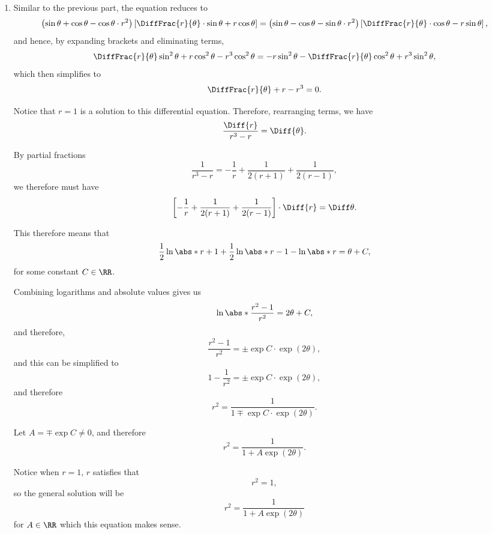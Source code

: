 \begin{enumerate}
    \item Similar to the previous part, the equation reduces to
          \[
              \left(\sin \theta + \cos \theta - \cos \theta \cdot r^2\right) \left[\DiffFrac{r}{\theta} \cdot \sin \theta + r \cos \theta\right] = \left(\sin \theta - \cos \theta - \sin \theta \cdot r^2\right) \left[\DiffFrac{r}{\theta} \cdot \cos \theta - r \sin \theta\right],
          \]
          and hence, by expanding brackets and eliminating terms,
          \[
              \DiffFrac{r}{\theta} \sin^2 \theta + r \cos^2 \theta - r^3 \cos^2 \theta = -r \sin^2 \theta - \DiffFrac{r}{\theta} \cos^2\theta + r^3 \sin^2 \theta,
          \]
          which then simplifies to
          \[
              \DiffFrac{r}{\theta} + r - r^3 = 0.
          \]

          Notice that \(r = 1\) is a solution to this differential equation. Therefore, rearranging terms, we have
          \[
              \frac{\Diff{r}}{r^3 - r} = \Diff{\theta}.
          \]

          By partial fractions
          \[
              \frac{1}{r^3 - r} = -\frac{1}{r} + \frac{1}{2(r + 1)} + \frac{1}{2(r - 1)},
          \]
          we therefore must have
          \[
              \left[-\frac{1}{r} + \frac{1}{2(r + 1)} + \frac{1}{2(r - 1)}\right] \cdot \Diff{r} = \Diff \theta.
          \]

          This therefore means that
          \[
              \frac{1}{2} \ln \abs*{r + 1} + \frac{1}{2} \ln \abs*{r - 1} - \ln \abs*{r} = \theta + C,
          \]
          for some constant \(C \in \RR\).

          Combining logarithms and absolute values gives us
          \[
              \ln \abs*{\frac{r^2 - 1}{r^2}} = 2\theta + C,
          \]
          and therefore,
          \[
              \frac{r^2 - 1}{r^2} = \pm \exp C \cdot \exp(2\theta),
          \]
          and this can be simplified to
          \[
              1 - \frac{1}{r^2} = \pm \exp C \cdot \exp(2\theta),
          \]
          and therefore
          \[
              r^2 = \frac{1}{1 \mp \exp C \cdot \exp(2\theta)}.
          \]

          Let \(A = \mp \exp C \neq 0\), and therefore
          \[
              r^2 = \frac{1}{1 + A \exp(2 \theta)}.
          \]

          Notice when \(r = 1\), \(r\) satisfies that
          \[
              r^2 = 1,
          \]
          so the general solution will be
          \[
              r^2 = \frac{1}{1 + A \exp(2 \theta)}
          \]
          for \(A \in \RR\) which this equation makes sense.


\end{enumerate}
